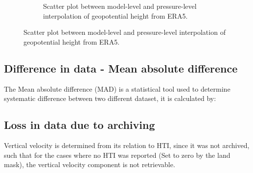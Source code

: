 \begin{figure}
\begin{subfigure}[h]{0.45\textwidth}
    \caption{Scatter plot between model-level and pressure-level interpolation of geopotential height from ERA5.}
    \label{fig:mlvsplgeopot}
    \end{subfigure}
\end{figure}

\subsection{Difference in data - Mean absolute difference}\label{sec:mad}
The Mean absolute difference (MAD) is a statistical tool used to determine systematic difference between two different dataset, it is calculated by:


\subsection{Loss in data due to archiving}

Vertical velocity is determined from its relation to HTI, since it was not archived, such that for the cases where no HTI was reported (Set to zero by the land mask), the vertical velocity component is not retrievable.